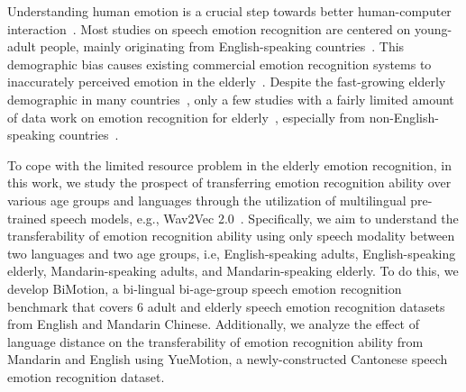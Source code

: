 \documentclass{INTERSPEECH2023}
\begin{document}
Understanding human emotion
is a crucial step towards better human-computer interaction~\cite{beale2008hci,cowie2001emot-rec,winata2021nora,ishii2021erica}. 
Most studies on speech emotion recognition are centered on young-adult people, mainly originating from English-speaking countries~\cite{busso2008iemocap,livingstone2018ryerson,zadeh2018multi,poria2019meld}. This demographic bias causes existing commercial emotion recognition systems to inaccurately perceived emotion in the elderly~\cite{kim2021agebias}.
Despite the fast-growing elderly demographic in many countries~\cite{rouzet2019ageing},
only a few studies with a fairly limited amount of data work on emotion recognition for elderly~\cite{cao2014crema,ma2019elderreact,pichora2020tess}, especially from non-English-speaking countries~\cite{lee2017csed}.

To cope with the limited resource problem in the elderly emotion recognition, in this work, we study the prospect of transferring emotion recognition ability over various age groups and languages through the utilization of multilingual pre-trained speech models, e.g., Wav2Vec 2.0~\cite{baevski2020wav2vec2}. Specifically, we aim to understand the transferability of emotion recognition ability using only speech modality between two languages and two age groups, i.e, English-speaking adults, English-speaking elderly, Mandarin-speaking adults, and Mandarin-speaking elderly. To do this, we develop BiMotion, a bi-lingual bi-age-group speech emotion recognition benchmark that covers 6 adult and elderly speech emotion recognition datasets from English and Mandarin Chinese. Additionally, we analyze the effect of language distance on the transferability of emotion recognition ability from Mandarin and English using YueMotion, a newly-constructed Cantonese speech emotion recognition dataset.
\end{document}

